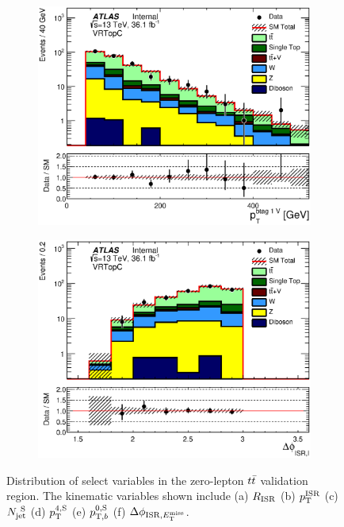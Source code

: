 \begin{figure}[h!]
\begin{subfigure}[b]{0.40\textwidth}
	    \includegraphics[width=\textwidth]{figures/ttbar/postfit/CA_pTbV1_VRTopC_log}
               \caption{ }
    \end{subfigure}
    	\begin{subfigure}[b]{0.40\textwidth}  
	    \includegraphics[width=\textwidth]{figures/ttbar/postfit/CA_dphiISRI_VRTopC_log}
               \caption{ }
    \end{subfigure}
      \caption[Distribution of select variables in the zero-lepton $\ttbar$ validation region]{Distribution of select variables in the zero-lepton $\ttbar$ validation region.  The kinematic variables shown include (a) $R_{\mathrm{ISR}}$ (b) $p_{\mathrm{T}}^{\mathrm{ISR}}$ (c) $N_{\mathrm{jet}}^{~\mathrm{S}}$ (d) $p_{\mathrm{T}}^{4,\mathrm{S}}$ (e) $p_{\mathrm{T},b}^{0,\mathrm{S}}$ (f) $\Delta\phi_{\mathrm{ISR},E_{\mathrm{T}}^{\mathrm{miss}}}$. }%
\label{fig:ttbar0Lep1bVRISR}
\end{figure}


